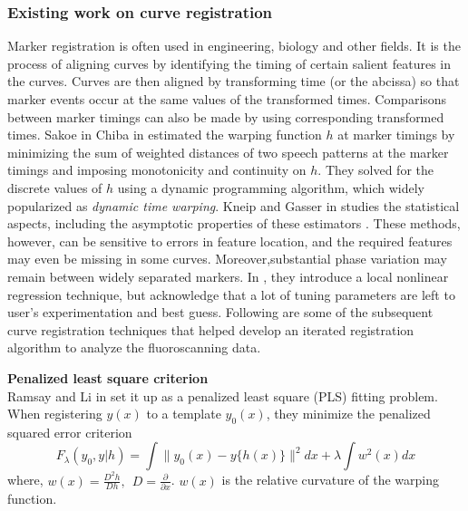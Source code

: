 \subsubsection{Existing work on curve registration} \label{ch3_registration}
Marker registration is often used in engineering, biology and other fields. It is the process of aligning curves by identifying the timing of certain salient features in the curves. Curves are then aligned by transforming time (or the abcissa) so that marker events occur at the same values of the transformed times. Comparisons between marker timings can also be made by using corresponding transformed times. Sakoe in Chiba in \cite{Sakoe_Chiba_1978_IEEE} estimated the warping function $h$ at marker timings by minimizing the sum of weighted distances of two speech patterns at the marker timings and imposing monotonicity and continuity on $h$. They solved for the discrete values of $h$ using a dynamic programming algorithm, which widely popularized as {\emph{dynamic time warping}}. Kneip and Gasser in \cite{Kneip_Gasser_1992_AnnStat} studies the statistical aspects, including the asymptotic properties of these estimators \cite{Kneip_etal_2000_CJS}. These methods, however, can be sensitive to errors in feature location, and the  required features may even be missing in some curves. Moreover,substantial phase variation may remain between widely separated markers. In \cite{Kneip_etal_2000_CJS}, they introduce a local nonlinear regression technique, but acknowledge that a lot of tuning parameters are left to user's experimentation and best guess. Following are some of the subsequent curve registration techniques that helped develop an iterated registration algorithm to analyze the fluoroscanning data. 

\noindent
{\bf{Penalized least square criterion}} \\
Ramsay and Li in \cite{Ramsay_Li_1998_JRSSB} set it up as a penalized least square (PLS) fitting problem. When registering $y(x)$ to a template $y_0(x)$, they minimize the penalized squared error criterion
\[ F_{\lambda}(y_0, y|h) = \displaystyle \int \| y_0(x) - y\{h(x)\} \|^2 dx + \lambda \displaystyle \int w^2(x)dx\]
where, $w(x) = \frac{D^2h}{Dh},\ \ D = \frac{\partial}{\partial x}$. $w(x)$ is the relative curvature of the warping function.

